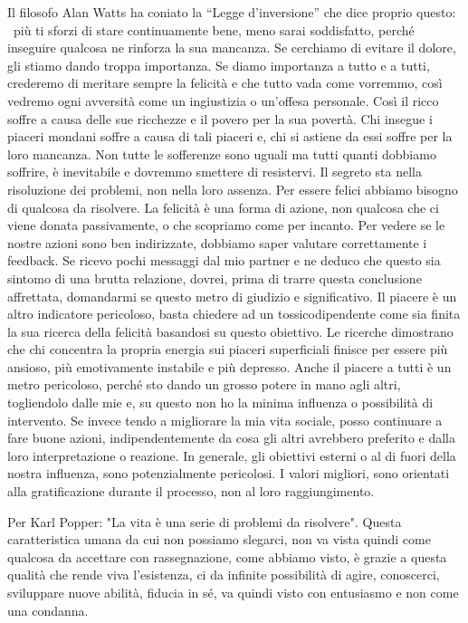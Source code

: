 \documentclass[12pt]{book} %
\begin{document}
Il filosofo Alan Watts ha coniato la “Legge d'inversione” che dice proprio questo: \ più ti sforzi
di stare continuamente bene, meno sarai soddisfatto, perché inseguire qualcosa ne rinforza la sua mancanza. Se
cerchiamo di evitare il dolore, gli stiamo dando troppa importanza. Se diamo importanza a tutto e a tutti, crederemo di
meritare sempre la felicità e che tutto vada come vorremmo, così vedremo ogni avversità come un ingiustizia o
un'offesa personale. Così il ricco soffre a causa delle sue ricchezze e il povero per la sua
povertà. Chi insegue i piaceri mondani soffre a causa di tali piaceri e, chi si astiene da essi soffre per la loro
mancanza. Non tutte le sofferenze sono uguali ma tutti quanti dobbiamo soffrire, è inevitabile e dovremmo smettere di
resistervi.\newline
Il segreto sta nella risoluzione dei problemi, non nella loro assenza. Per essere felici abbiamo bisogno di qualcosa da
risolvere. La felicità è una forma di azione, non qualcosa che ci viene donata passivamente, o che scopriamo come per
incanto. Per vedere se le nostre azioni sono ben indirizzate, dobbiamo saper valutare correttamente i feedback. Se
ricevo pochi messaggi dal mio partner e ne deduco che questo sia sintomo di una brutta relazione, dovrei, prima di
trarre questa conclusione affrettata, domandarmi se questo metro di giudizio e significativo. Il piacere è un altro
indicatore pericoloso, basta chiedere ad un tossicodipendente come sia finita la sua ricerca della felicità basandosi
su questo obiettivo. Le ricerche dimostrano che chi concentra la propria energia sui piaceri superficiali finisce per
essere più ansioso, più emotivamente instabile e più depresso. Anche il piacere a tutti è un metro pericoloso, perché
sto dando un grosso potere in mano agli altri, togliendolo dalle mie e, su questo non ho la minima influenza o
possibilità di intervento. Se invece tendo a migliorare la mia vita sociale, posso continuare a fare buone azioni,
indipendentemente da cosa gli altri avrebbero preferito e dalla loro interpretazione o reazione. In generale, gli
obiettivi esterni o al di fuori della nostra influenza, sono potenzialmente pericolosi. I valori migliori, sono
orientati alla gratificazione durante il processo, non al loro raggiungimento.

Per Karl Popper: "La vita è una serie di problemi da risolvere". Questa
caratteristica umana da cui non possiamo slegarci, non va vista quindi come qualcosa da accettare con rassegnazione,
come abbiamo visto, è grazie a questa qualità che rende viva l'esistenza, ci da infinite
possibilità di agire, conoscerci, sviluppare nuove abilità, fiducia in sé, va quindi visto con entusiasmo e non come
una condanna.
\end{document}
